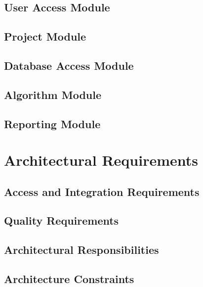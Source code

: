 \documentclass[hidelinks, 12pt, oneside]{article}
\begin{document}
\subsection{User Access Module}

\subsection{Project Module}

\subsection{Database Access Module}

\subsection{Algorithm Module}

\subsection{Reporting Module}

\section{Architectural Requirements}
\subsection{Access and Integration Requirements}

\subsection{Quality Requirements}

\subsection{Architectural Responsibilities}

\subsection{Architecture Constraints}

\end{document}
